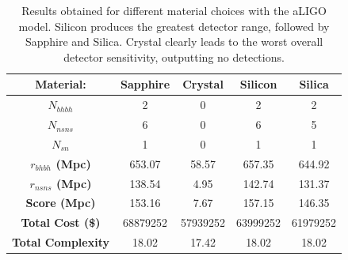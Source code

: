 \documentclass{article}
\begin{document}
    \begin{table}[h]
    	\centering
  \captionsetup{width=0.9\textwidth}
         \caption{Results obtained for different material choices with
           the aLIGO model. Silicon produces the greatest detector
           range, followed by Sapphire and Silica. Crystal clearly
           leads to the worst overall detector sensitivity, outputting
           no detections.}
    \begin{tabular}{ |c|c|c|c|c| } 
     \hline
     \textbf{Material:} & \textbf{Sapphire}  & \textbf{Crystal}  & \textbf{Silicon}  & \textbf{Silica} \\ 
     \hline
     \textbf{$N_{bhbh}$}  & 2 & 0 & 2 & 2\\ 
     \hline
     \textbf{$N_{nsns}$}  & 6 & 0 & 6 & 5\\ 
     \hline
     \textbf{$N_{sn}$}  & 1 & 0  & 1 & 1 \\ 
     \hline
     \textbf{$r_{bhbh}$ (Mpc)}  & 653.07 & 58.57  & 657.35  & 644.92 \\ 
     \hline
      \textbf{$r_{nsns}$ (Mpc)}  & 138.54  & 4.95  & 142.74 & 131.37 \\ 
      \hline
    \textbf{Score (Mpc)}  & 153.16  & 7.67  & 157.15  & 146.35 \\
    \hline
    \textbf{Total Cost (\$)}  & 68879252  & 57939252  & 63999252  & 61979252 \\ 
    \hline
      \textbf{Total Complexity}  & 18.02  & 17.42  & 18.02  & 18.02 \\ 
     \hline
    \end{tabular}
    \label{tab::materialstest}

    \end{table}
    
\end{document}

